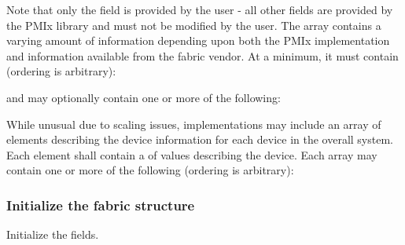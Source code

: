 Note that only the  field is provided by the user - all other fields are provided by the \ac{PMIx} library and must not be modified by the user. The  array contains a varying amount of information depending upon both the \ac{PMIx} implementation and information available from the fabric vendor. At a minimum, it must contain (ordering is arbitrary):

\reqattrstart


\reqattrend

and may optionally contain one or more of the following:

\optattrstart
{}

While unusual due to scaling issues, implementations may include an array of  elements describing the device information for each device in the overall system. Each element shall contain a  of  values describing the device. Each array may contain one or more of the following (ordering is arbitrary):


\optattrend

\subsubsection{Initialize the fabric structure}

Initialize the  fields.

